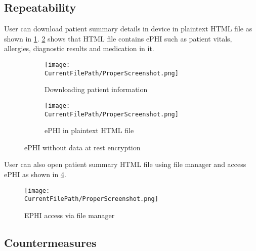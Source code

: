 
\newpage


\subsection*{Repeatability}

User can download patient summary details in device in plaintext HTML file as shown in \cref{figure:003.ephi_2.jpg}. \cref{figure:005.ephi_in_html_file} shows that HTML file contains ePHI such as patient vitals, allergies, diagnostic results and medication in it.

\begin{figure}[h]
	\begin{subfigure}{0.5\textwidth}
	\texttt{[image: \\CurrentFilePath/ProperScreenshot.png]} 
	\caption{Downloading patient information}
	\label{figure:003.ephi_2.jpg}
	\end{subfigure}
	\begin{subfigure}{0.5\textwidth}
	\texttt{[image: \\CurrentFilePath/ProperScreenshot.png]}
	\caption{ePHI in plaintext HTML file}
	\label{figure:005.ephi_in_html_file}
	\end{subfigure}
	\caption{ePHI without data at rest encryption}
	\label{fig:005.ephi_in_html_file}
\end{figure}

\newpage

User can also open patient summary HTML file using file manager and access ePHI as shown in \cref{figure:006.patient_data_file_location}.

\begin{figure}[H]
\centering
\texttt{[image: \\CurrentFilePath/ProperScreenshot.png]}
\caption{EPHI access via file manager}
\label{figure:006.patient_data_file_location}
\end{figure}




 



\subsection*{Countermeasures}

